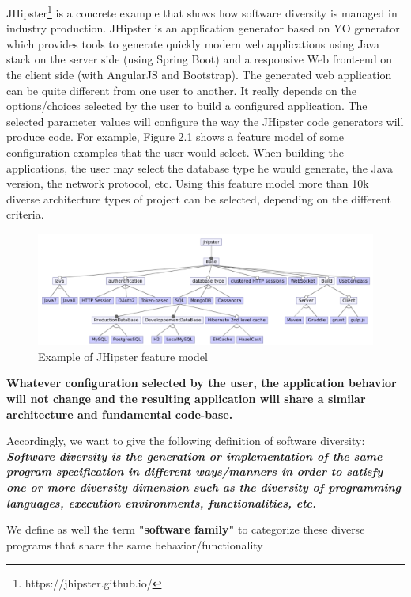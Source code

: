 JHipster\footnote{https://jhipster.github.io/} is a concrete example that shows how software diversity is managed in industry production. JHipster is an application generator based on YO generator which provides tools to generate quickly modern web applications using Java stack on the server side (using Spring Boot) and a responsive Web front-end on the client side (with AngularJS and Bootstrap).
The generated web application can be quite different from one user to another. It really depends on the options/choices selected by the user to build a configured application. The selected parameter values will configure the way the JHipster code generators will produce code. 
For example, Figure 2.1 shows a feature model of some configuration examples that the user would select. When building the applications, the user may select the database type he would generate, the Java version, the network protocol, etc. 
Using this feature model more than 10k diverse architecture types of project can be selected, depending on the different criteria.
\begin{figure}[h]
	\center
	\includegraphics[scale=0.65]{Background/fig/jhipster}
	\caption{Example of JHipster feature model}
\end{figure}

\textbf{Whatever configuration selected by the user, the application behavior will not change and the resulting application will share a similar architecture and fundamental code-base.}

Accordingly, we want to give the following definition of software diversity: 
\textit{\textbf{Software diversity is the generation or implementation of the same program specification in different ways/manners in order to satisfy one or more diversity dimension such as the diversity of programming languages, execution environments, functionalities, etc. }}
		
We define as well the term \textbf{"software family"} to categorize these diverse programs that share the same behavior/functionality



